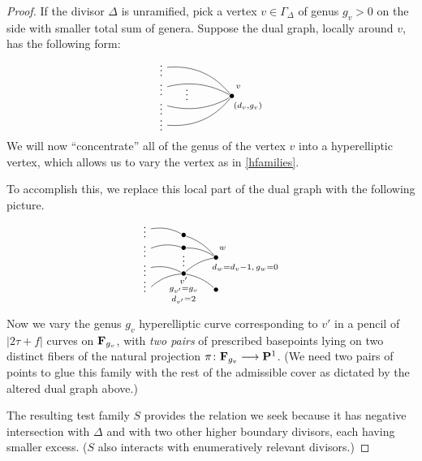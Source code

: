 \documentclass[reqno, 10 pt]{article}
\theoremstyle{definition}
\theoremstyle{remark}
\numberwithin{equation}{section}
\numberwithin{thm}{section}
\numberwithin{prop}{section}
\numberwithin{lem}{section}
\numberwithin{cor}{section}
\numberwithin{conj}{section}
\numberwithin{defn}{section}
\begin{document}
    \begin{proof}
    If the divisor $\Delta$ is unramified, pick a vertex $v \in \Gamma_{\Delta}$ of genus $g_v > 0$ on the side with smaller total sum of genera.  Suppose the dual graph, locally around $v$, has the following form: \[   \xygraph{
    !{<0cm,0cm>;<1cm,0cm>:<0cm,1cm>::}
    !{(0,.9) }*{}="l_1"
    !{(0,.3) }*{}="l_2"
    !{(0,-.3) }*{}="l_3"
    !{(0,-.9) }*{}="l_4"
    !{(2,0) }*{\bullet}="r"
    !{(.6,.15) }*{\vdots}
    !{(-.2,.9) }*{\vdots}
    !{(-.2,.3) }*{\vdots}
    !{(-.2,-.3) }*{\vdots}
    !{(-.2,-.8) }*{\vdots}
    !{(2.2,.3) }*{\scriptstyle v }
    !{(2.5,-.3) }*{\scriptstyle (d_v, g_v) }
     "l_1"-@/^.3cm/"r" 
    "l_2"-@/^/"r"
    "l_3"-@/_/"r" 
    "l_4"-@/_.3cm/"r" 
    }  \]
     We will now ``concentrate'' all of the genus of the vertex $v$ into a hyperelliptic vertex, which allows us to vary the vertex as in \autoref{hfamilies}.  

     To accomplish this, we  replace this local part of the dual graph with the following picture. 
     \begin{equation}\label{hyp-mod}
       \xygraph{
    !{<0cm,0cm>;<1cm,0cm>:<0cm,1cm>::}
    !{(0,.9) }*{}="l_1"
    !{(0,.3) }*{}="l_2"
    !{(0,-.3) }*{}="l_3"
    !{(0,-.9) }*{}="l_4"
    !{(2,0) }*{\bullet}="r"
    !{(2,-1) }*{\bullet}="r_2"
    !{(1,.7) }*{\bullet}="m_1"
    !{(1,.3) }*{\bullet}="m_2"
    !{(1,-.5) }*{\bullet}="m"!{(1,-.7) }*{\scriptstyle v'}!{(1,-1) }*{\scriptstyle g_{v'} = g_v}!{(1,-1.3) }*{\scriptstyle d_{v'} = 2}
    !{(1,0) }*{\vdots}
    !{(-.2,.9) }*{\vdots}
    !{(-.2,.3) }*{\vdots}
    !{(-.2,-.3) }*{\vdots}
    !{(-.2,-.8) }*{\vdots}
    !{(2.2,.3) }*{\scriptstyle w }
    !{(2.9,-.3) }*{\scriptstyle d_w = d_v-1 , \,g_w = 0 }
     "m_1"-@/^.1cm/"r" 
    "m_2"-@/^.1cm/"r"
    "m"-@/^.1cm/"r" 
    "m"-@/^.1cm/"r_2" 
    "m"-@/_.1cm/"l_4" 
    "m"-@/_.1cm/"l_3" 
    "m_2"-@/_.1cm/"l_2"
    "m_1"-@/_.1cm/"l_1"
    }  
    \end{equation}

    Now we vary the genus $g_v$ hyperelliptic curve corresponding to $v'$ in a pencil of $|2\tau + f|$ curves on ${\bf F}_{g_v}$, with {\sl two pairs} of prescribed basepoints lying on two distinct fibers of the natural projection $\pi \colon {\bf F}_{g_v} \longrightarrow {\bf P}^1$.  (We need two pairs of points to glue this family with the rest of the admissible cover as dictated by the altered dual graph above.)  

    The resulting test family $S$  provides the relation we seek because it has negative intersection with $\Delta$ and with two other higher boundary divisors, each having smaller excess. ($S$  also interacts with enumeratively relevant divisors.)


\end{proof}
\end{document}
